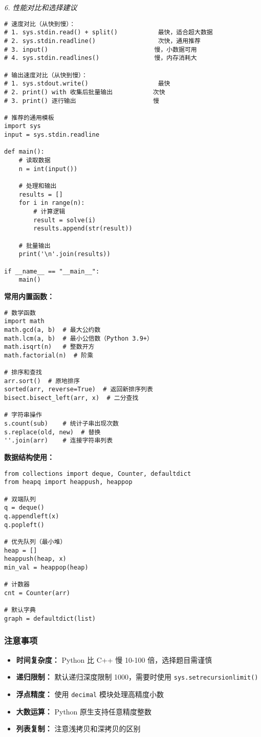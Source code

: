 \documentclass[a4paper,9pt,twocolumn]{ctexart}
\begin{document}
\textit{6. 性能对比和选择建议}
\begin{verbatim}
# 速度对比（从快到慢）：
# 1. sys.stdin.read() + split()           最快，适合超大数据
# 2. sys.stdin.readline()                 次快，通用推荐
# 3. input()                             慢，小数据可用
# 4. sys.stdin.readlines()               慢，内存消耗大

# 输出速度对比（从快到慢）：
# 1. sys.stdout.write()                   最快
# 2. print() with 收集后批量输出           次快
# 3. print() 逐行输出                     慢

# 推荐的通用模板
import sys
input = sys.stdin.readline

def main():
    # 读取数据
    n = int(input())
    
    # 处理和输出
    results = []
    for i in range(n):
        # 计算逻辑
        result = solve(i)
        results.append(str(result))
    
    # 批量输出
    print('\n'.join(results))

if __name__ == "__main__":
    main()
\end{verbatim}

\textbf{常用内置函数：}
\begin{verbatim}
# 数学函数
import math
math.gcd(a, b)  # 最大公约数
math.lcm(a, b)  # 最小公倍数（Python 3.9+）
math.isqrt(n)   # 整数开方
math.factorial(n)  # 阶乘

# 排序和查找
arr.sort()  # 原地排序
sorted(arr, reverse=True)  # 返回新排序列表
bisect.bisect_left(arr, x)  # 二分查找

# 字符串操作
s.count(sub)    # 统计子串出现次数
s.replace(old, new)  # 替换
''.join(arr)    # 连接字符串列表
\end{verbatim}

\textbf{数据结构使用：}
\begin{verbatim}
from collections import deque, Counter, defaultdict
from heapq import heappush, heappop

# 双端队列
q = deque()
q.appendleft(x)
q.popleft()

# 优先队列（最小堆）
heap = []
heappush(heap, x)
min_val = heappop(heap)

# 计数器
cnt = Counter(arr)

# 默认字典
graph = defaultdict(list)
\end{verbatim}

\subsubsection{注意事项}
\begin{itemize}
\item \textbf{时间复杂度：} Python 比 C++ 慢 10-100 倍，选择题目需谨慎
\item \textbf{递归限制：} 默认递归深度限制 1000，需要时使用 \texttt{sys.setrecursionlimit()}
\item \textbf{浮点精度：} 使用 \texttt{decimal} 模块处理高精度小数
\item \textbf{大数运算：} Python 原生支持任意精度整数
\item \textbf{列表复制：} 注意浅拷贝和深拷贝的区别
\end{itemize}
\end{document}
